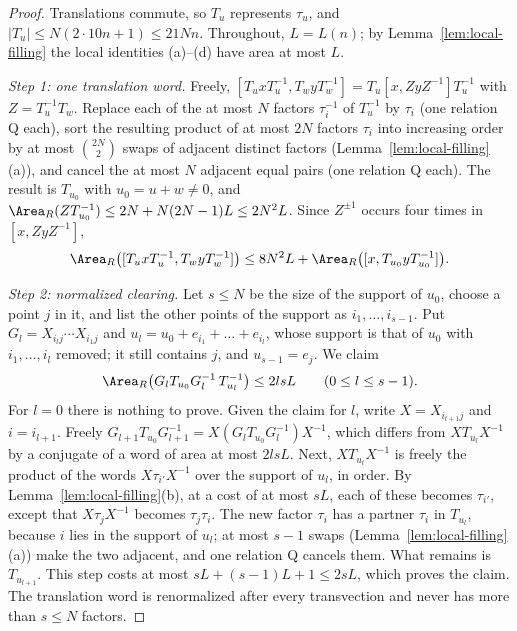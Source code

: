 \begin{proof}
Translations commute, so $T_u$ represents $\tau_u$, and $|T_u|\le N(2\cdot10n+1)\le21Nn$. Throughout, $L=L(n)$; by
Lemma~\ref{lem:local-filling} the local identities (a)--(d) have area at most $L$.

\emph{Step 1: one translation word.} Freely, $[T_uxT_u^{-1},T_wyT_w^{-1}]=T_u[x,ZyZ^{-1}]T_u^{-1}$ with $Z=T_u^{-1}T_w$. Replace each of the at
most $N$ factors $\tau_i^{-1}$ of $T_u^{-1}$ by $\tau_i$ (one relation \textsf{Q} each), sort the resulting product of at most $2N$ factors
$\tau_i$ into increasing order by at most $\binom{2N}2$ swaps of adjacent distinct factors (Lemma~\ref{lem:local-filling}(a)), and cancel the at
most $N$ adjacent equal pairs (one relation \textsf{Q} each). The result is $T_{u_0}$ with $u_0=u+w\ne0$, and
$\Area_R(ZT_{u_0}^{-1})\le2N+N(2N-1)L\le2N^2L$. Since $Z^{\pm1}$ occurs four times in $[x,ZyZ^{-1}]$,
\[
\Area_R\bigl([T_uxT_u^{-1},T_wyT_w^{-1}]\bigr)\le8N^2L+\Area_R\bigl([x,T_{u_0}yT_{u_0}^{-1}]\bigr).
\]

\emph{Step 2: normalized clearing.} Let $s\le N$ be the size of the support of $u_0$, choose a point $j$ in it, and list the other points of the
support as $i_1,\dots,i_{s-1}$. Put $G_l=X_{i_lj}\cdots X_{i_1j}$ and $u_l=u_0+e_{i_1}+\dots+e_{i_l}$, whose support is that of $u_0$ with
$i_1,\dots,i_l$ removed; it still contains $j$, and $u_{s-1}=e_j$. We claim
\[
\Area_R\bigl(G_lT_{u_0}G_l^{-1}\,T_{u_l}^{-1}\bigr)\le2lsL\qquad(0\le l\le s-1).
\]
For $l=0$ there is nothing to prove. Given the claim for $l$, write $X=X_{i_{l+1}j}$ and $i=i_{l+1}$. Freely
$G_{l+1}T_{u_0}G_{l+1}^{-1}=X(G_lT_{u_0}G_l^{-1})X^{-1}$, which differs from $XT_{u_l}X^{-1}$ by a conjugate of a word of area at most $2lsL$. Next,
$XT_{u_l}X^{-1}$ is freely the product of the words $X\tau_{i'}X^{-1}$ over the support of $u_l$, in order. By Lemma~\ref{lem:local-filling}(b),
at a cost of at most $sL$, each of these becomes $\tau_{i'}$, except that $X\tau_jX^{-1}$ becomes $\tau_j\tau_i$. The new factor $\tau_i$ has a
partner $\tau_i$ in $T_{u_l}$, because $i$ lies in the support of $u_l$; at most $s-1$ swaps (Lemma~\ref{lem:local-filling}(a)) make the two
adjacent, and one relation \textsf{Q} cancels them. What remains is $T_{u_{l+1}}$. This step costs at most $sL+(s-1)L+1\le2sL$, which proves the
claim. The translation word is renormalized after every transvection and never has more than $s\le N$ factors.


\end{proof}
